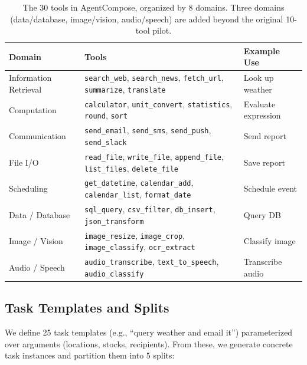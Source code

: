 ﻿\documentclass{article}
\begin{document}
\begin{table}[t]
    \centering
    \footnotesize
    \begin{tabular}{p{1.6in}p{2.4in}p{1.0in}}
        \toprule
        Domain & Tools & Example Use \\
        \midrule
        Information Retrieval & \texttt{search\_web}, \texttt{search\_news}, \texttt{fetch\_url}, \texttt{summarize}, \texttt{translate} & Look up weather \\
        Computation & \texttt{calculator}, \texttt{unit\_convert}, \texttt{statistics}, \texttt{round}, \texttt{sort} & Evaluate expression \\
        Communication & \texttt{send\_email}, \texttt{send\_sms}, \texttt{send\_push}, \texttt{send\_slack} & Send report \\
        File I/O & \texttt{read\_file}, \texttt{write\_file}, \texttt{append\_file}, \texttt{list\_files}, \texttt{delete\_file} & Save report \\
        Scheduling & \texttt{get\_datetime}, \texttt{calendar\_add}, \texttt{calendar\_list}, \texttt{format\_date} & Schedule event \\
        Data / Database & \texttt{sql\_query}, \texttt{csv\_filter}, \texttt{db\_insert}, \texttt{json\_transform} & Query DB \\
        Image / Vision & \texttt{image\_resize}, \texttt{image\_crop}, \texttt{image\_classify}, \texttt{ocr\_extract} & Classify image \\
        Audio / Speech & \texttt{audio\_transcribe}, \texttt{text\_to\_speech}, \texttt{audio\_classify} & Transcribe audio \\
        \bottomrule
    \end{tabular}
    \caption{The 30 tools in AgentCompose, organized by 8 domains. Three domains (data/database, image/vision, audio/speech) are added beyond the original 10-tool pilot.}
    \label{tab:tools}
\end{table}

\subsection{Task Templates and Splits}

We define 25 task templates (e.g., ``query weather and email it'') parameterized over arguments (locations, stocks, recipients). From these, we generate concrete task instances and partition them into 5 splits:
\end{document}
